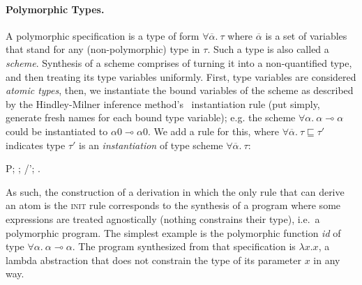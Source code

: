 \documentclass{llncs}
\newcommand{\lolli}{\multimap}
\newcommand{\mypara}[1]{\paragraph{\textbf{#1}.}}
\def\Rho{P}
\begin{document}
\mypara{Polymorphic Types} A polymorphic specification is a type of form
$\forall \overline{\alpha}.\ \tau$ where $\overline{\alpha}$ is a set of
variables that stand for any (non-polymorphic) type in $\tau$. Such a type is
also called a \emph{scheme}.  Synthesis of a scheme comprises of turning it into
a non-quantified type, and then treating its type variables uniformly.  First,
type variables are considered \emph{atomic types}, then, we instantiate the
bound variables of the scheme as described by the Hindley-Milner inference
method's~\cite{HM-infer} instantiation rule (put simply, generate fresh names
for each bound type variable); e.g. the scheme $\forall \alpha.\ \alpha \lolli
\alpha$ could be instantiated to $\alpha0 \lolli \alpha0$. We add a rule for
this, where $\forall \overline{\alpha}.\ \tau \sqsubseteq \tau'$ indicates type
$\tau'$ is an \emph{instantiation} of type scheme $\forall \overline{\alpha}.\
\tau$:
%
\begin{mathpar}
    \infer*[right=($\forall R$)]
    { \Rho; \Gamma; \Delta/\Delta'; \Omega \vdash \tau' \Uparrow \and \forall
    \overline{\alpha}.\ \tau
    \sqsubseteq \tau'}
    {\Rho; \Gamma; \Delta/\Delta'; \Omega \vdash \forall \overline{\alpha}.\
    \tau \Uparrow}
\end{mathpar}
%
As such, the construction of a derivation in which the only rule that can derive
an atom is the \textsc{init} rule corresponds to the synthesis of a program
where some expressions are treated agnostically (nothing constrains their type),
i.e.~a polymorphic program. The simplest example is the polymorphic function
\emph{id} of type $\forall \alpha .\ \alpha \lolli \alpha$. The program
synthesized from that specification is $\lambda x . x$, a lambda abstraction
that does not constrain the type of its parameter $x$ in any way.
\end{document}
